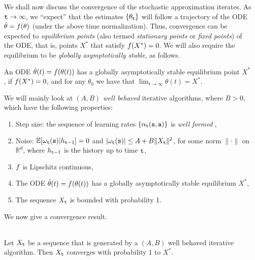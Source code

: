 We shall now discuss the convergence of the stochastic approximation iterates.  As ${\tt t}\to\infty$, we ``expect'' that the estimates
$\{\theta_{\tt t}\}$ will follow a trajectory of the ODE $\dot\theta=f(\theta)$
(under the above time normalization). Thus, convergence can be expected to \textit{equilibrium points} (also termed \textit{stationary points} or \textit{fixed points}) of the ODE, that is, points $X^*$ that satisfy 
$f(X^*) = 0$. We will also require the equilibrium to be {\em globally asymptotically stable}, as follows.
\begin{definition}
An ODE $\dot \theta(t) = f(\theta(t))$ has a globally asymptotically stable equilibrium point $X^*$, if $f(X^*) = 0$, and
for any $\theta_0$ we have that $\lim_{t \to \infty} \theta(t) = X^*$.
\end{definition}

We will mainly look at {\em $(A,B)$ well behaved} iterative
algorithms, where $B>0$, which have the
following properties:
\begin{enumerate}
\item Step size: the sequence of learning rates $\{\alpha_{\tt t}({\tt s},{\tt a})\}$ is \emph{well formed} ,
\item Noise: $\mathbb{E}[\omega_{\tt t}({\tt s})|h_{{\tt t}-1}]=0$ and $|\omega_{\tt t}({\tt s})|\leq A + B\| X_{\tt t}\|^2$, for some norm $\| \cdot \|$ on $\mathbb{R}^d$, where
$h_{{\tt t}-1}$ is the history up to time ${\tt t}$,
\item $f$ is Lipschitz continuous,
\item The ODE $\dot \theta(t) = f(\theta(t))$ has a globally asymptotically stable equilibrium $X^*$,
\item The sequence $X_{\tt t}$ is bounded with probability 1.
\end{enumerate}
We now give a convergence result.

\begin{theorem}\ \\
\label{thm:stoch-approx-ODE}
 Let $X_{\tt t}$ be a sequence that is generated by a
$(A,B)$ well behaved iterative algorithm. Then $X_{\tt t}$
converges with probability $1$ to $X^*$.
\end{theorem}



